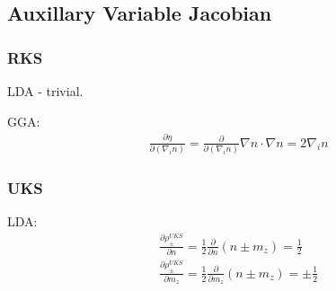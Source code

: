 \documentclass[11pt]{article}
\begin{document}
\subsection{Auxillary Variable Jacobian}

\subsubsection{RKS}
LDA - trivial.

GGA:
\begin{align}
  &\frac{\partial \eta}{\partial (\nabla_i n)} = \frac{\partial}{\partial (\nabla_i n)} \nabla n \cdot \nabla n = 2 \nabla_i n
\end{align}

\subsubsection{UKS}
LDA:
\begin{align}
  &\frac{\partial \rho_\pm^{UKS}}{\partial n}   = \frac{1}{2} \frac{\partial}{\partial n} (n \pm m_z) = \frac{1}{2} \\ 
  &\frac{\partial \rho_\pm^{UKS}}{\partial m_z} = \frac{1}{2} \frac{\partial}{\partial m_z} (n \pm m_z) = \pm\frac{1}{2}  
\end{align}
\end{document}
